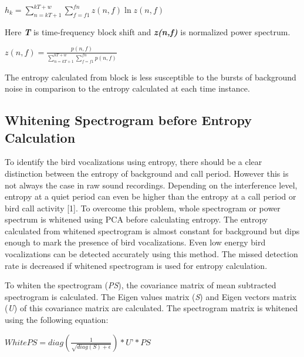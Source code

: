 \documentclass[a4paper]{article}
\begin{document}
  $h_{k}=\sum_{n=kT+1}^{kT+w}\sum_{f=f1}^{fn}z(n,f) \ln z(n,f)$

 \hspace{1cm}
 
Here \textbf{\textit{T}} is time-frequency block shift and \textbf{\textit{z(n,f)}} is normalized power spectrum.


\hspace{1cm}

$z(n,f)=\frac {p(n,f)}
{\sum_{n=kT+1}^{kT+w}\sum_{f=f1}^{fn} p(n,f)}$

\hspace{1cm}


The entropy calculated from block is less susceptible to the bursts of background noise in comparison to the entropy calculated at each time instance. 


\subsection{Whitening Spectrogram before Entropy Calculation}

To identify the bird vocalizations using entropy, there should be a clear distinction between the entropy of background and call period. However this is not always the case in raw sound recordings. Depending on the interference level, entropy at a quiet period can even be higher than the entropy at a call period or bird call activity [1]. To overcome this problem, whole spectrogram or power spectrum is whitened using PCA  before calculating entropy. The entropy calculated from whitened spectrogram is almost constant for background but dips enough to mark the presence of bird vocalizations. Even low energy bird vocalizations can be detected accurately using this method. The missed detection rate is decreased if whitened spectrogram is used for entropy calculation. 

To whiten the spectrogram (\textit{PS}), the covariance matrix of mean subtracted spectrogram is calculated. The Eigen values matrix (\textit{S}) and Eigen vectors matrix (\textit{U}) of this covariance matrix are calculated. The spectrogram matrix is whitened using the following equation:

\hspace{1cm}

$WhitePS=diag(\frac{1}{\sqrt{diag(S)+\epsilon}})*\textit{U'}*\textit{PS}$


\hspace{1cm}
\end{document}

